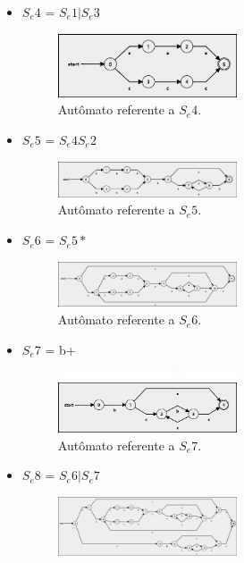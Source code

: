 \documentclass[
	article,			%
	11pt,				%
	oneside,			%
	a4paper,			%
	english,			%
	brazil,				%
	sumario=tradicional
	]{abntex2}
\begin{document}
\begin{itemize}
        \item $S_e4$ = $S_e1|S_e3$ 
            \begin{figure}[H]
\centering
\includegraphics[width=0.5\textwidth]{r4.jpg}
\caption{\label{fig:r4}Autômato referente a $S_e4$.}
\end{figure}
        \item $S_e5$ = $S_e4S_e2$ 
            \begin{figure}[H]
\centering
\includegraphics[width=0.5\textwidth]{r5.jpg}
\caption{\label{fig:r5}Autômato referente a $S_e5$.}
\end{figure}
        \item $S_e6$ = $S_e5*$ 
            \begin{figure}[H]
\centering
\includegraphics[width=0.5\textwidth]{r6.jpg}
\caption{\label{fig:r6}Autômato referente a $S_e6$.}
\end{figure}
        \item $S_e7$ = b+ 
            \begin{figure}[H]
\centering
\includegraphics[width=0.5\textwidth]{r7.jpg}
\caption{\label{fig:r7}Autômato referente a $S_e7$.}
\end{figure}
        \item $S_e8$ = $S_e6|S_e7$ 
            \begin{figure}[H]
\centering
\includegraphics[width=0.5\textwidth]{r8.jpg}

\end{figure}
\end{itemize}
\end{document}
